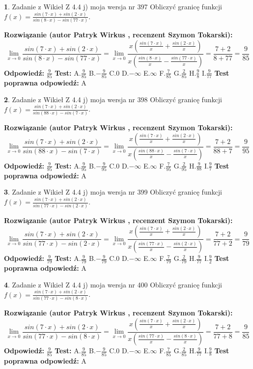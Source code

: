\documentclass[12pt, a4paper]{article}
\theoremstyle{definition} %
\newtheorem{zad}{}
\newcommand{\zadStart}[1]{\begin{zad}#1\newline}
\newcommand{\zadStop}{\end{zad}}
\newcommand{\rozwStart}[2]{\noindent \textbf{Rozwiązanie (autor #1 , recenzent #2): }\newline}
\newcommand{\rozwStop}{\newline}
\newcommand{\odpStart}{\noindent \textbf{Odpowiedź:}\newline}
\newcommand{\odpStop}{\newline}
\newcommand{\testStart}{\noindent \textbf{Test:}\newline}
\newcommand{\testStop}{\newline}
\newcommand{\kluczStart}{\noindent \textbf{Test poprawna odpowiedź:}\newline}
\newcommand{\kluczStop}{\newline}
\begin{document}
\zadStart{Zadanie z Wikieł Z 4.4 j) moja wersja nr 397}
Obliczyć granicę funkcji $f(x)=\frac{sin(7\cdot x) +sin(2\cdot x)}{sin(8\cdot x) -sin(77\cdot x)}$.
\zadStop
\rozwStart{Patryk Wirkus}{Szymon Tokarski}
$$\lim\limits_{x\to 0}\frac{sin(7\cdot x) +sin(2\cdot x)}{sin(8\cdot x) -sin(77\cdot x)}=\lim\limits_{x\to 0}\frac{x(\frac{sin(7\cdot x)}{x}+\frac{sin(2\cdot x)}{x})}{x(\frac{sin(8\cdot x)}{x}-\frac{sin(77\cdot x)}{x})}=\frac{7+2}{8+77} = \frac{9}{85}$$
\rozwStop
\odpStart
$\frac{9}{85}$
\odpStop
\testStart
A.$\frac{9}{85}$
B.$-\frac{9}{85}$
C.$0$
D.$-\infty$
E.$\infty$
F.$\frac{7}{85}$
G.$\frac{2}{85}$
H.$\frac{9}{8}$
I.$\frac{9}{77}$
\testStop
\kluczStart
A
\kluczStop



\zadStart{Zadanie z Wikieł Z 4.4 j) moja wersja nr 398}
Obliczyć granicę funkcji $f(x)=\frac{sin(7\cdot x) +sin(2\cdot x)}{sin(88\cdot x) -sin(7\cdot x)}$.
\zadStop
\rozwStart{Patryk Wirkus}{Szymon Tokarski}
$$\lim\limits_{x\to 0}\frac{sin(7\cdot x) +sin(2\cdot x)}{sin(88\cdot x) -sin(7\cdot x)}=\lim\limits_{x\to 0}\frac{x(\frac{sin(7\cdot x)}{x}+\frac{sin(2\cdot x)}{x})}{x(\frac{sin(88\cdot x)}{x}-\frac{sin(7\cdot x)}{x})}=\frac{7+2}{88+7} = \frac{9}{95}$$
\rozwStop
\odpStart
$\frac{9}{95}$
\odpStop
\testStart
A.$\frac{9}{95}$
B.$-\frac{9}{95}$
C.$0$
D.$-\infty$
E.$\infty$
F.$\frac{7}{95}$
G.$\frac{2}{95}$
H.$\frac{9}{88}$
I.$\frac{9}{7}$
\testStop
\kluczStart
A
\kluczStop



\zadStart{Zadanie z Wikieł Z 4.4 j) moja wersja nr 399}
Obliczyć granicę funkcji $f(x)=\frac{sin(7\cdot x) +sin(2\cdot x)}{sin(77\cdot x) -sin(2\cdot x)}$.
\zadStop
\rozwStart{Patryk Wirkus}{Szymon Tokarski}
$$\lim\limits_{x\to 0}\frac{sin(7\cdot x) +sin(2\cdot x)}{sin(77\cdot x) -sin(2\cdot x)}=\lim\limits_{x\to 0}\frac{x(\frac{sin(7\cdot x)}{x}+\frac{sin(2\cdot x)}{x})}{x(\frac{sin(77\cdot x)}{x}-\frac{sin(2\cdot x)}{x})}=\frac{7+2}{77+2} = \frac{9}{79}$$
\rozwStop
\odpStart
$\frac{9}{79}$
\odpStop
\testStart
A.$\frac{9}{79}$
B.$-\frac{9}{79}$
C.$0$
D.$-\infty$
E.$\infty$
F.$\frac{7}{79}$
G.$\frac{2}{79}$
H.$\frac{9}{77}$
I.$\frac{9}{2}$
\testStop
\kluczStart
A
\kluczStop



\zadStart{Zadanie z Wikieł Z 4.4 j) moja wersja nr 400}
Obliczyć granicę funkcji $f(x)=\frac{sin(7\cdot x) +sin(2\cdot x)}{sin(77\cdot x) -sin(8\cdot x)}$.
\zadStop
\rozwStart{Patryk Wirkus}{Szymon Tokarski}
$$\lim\limits_{x\to 0}\frac{sin(7\cdot x) +sin(2\cdot x)}{sin(77\cdot x) -sin(8\cdot x)}=\lim\limits_{x\to 0}\frac{x(\frac{sin(7\cdot x)}{x}+\frac{sin(2\cdot x)}{x})}{x(\frac{sin(77\cdot x)}{x}-\frac{sin(8\cdot x)}{x})}=\frac{7+2}{77+8} = \frac{9}{85}$$
\rozwStop
\odpStart
$\frac{9}{85}$
\odpStop
\testStart
A.$\frac{9}{85}$
B.$-\frac{9}{85}$
C.$0$
D.$-\infty$
E.$\infty$
F.$\frac{7}{85}$
G.$\frac{2}{85}$
H.$\frac{9}{77}$
I.$\frac{9}{8}$
\testStop
\kluczStart
A
\kluczStop
\end{document}
